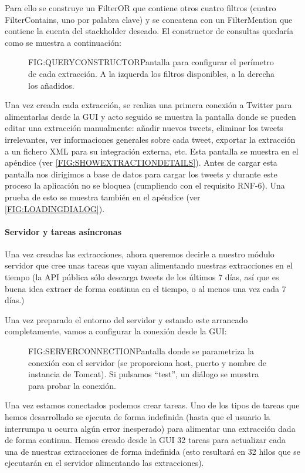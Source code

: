 Para ello se construye un FilterOR que contiene otros cuatro filtros (cuatro FilterContains, uno por palabra clave) y se concatena con un FilterMention que contiene la cuenta del stackholder deseado. El constructor de consultas quedaría como se muestra a continuación:

\begin{figure}[Constructor de consultas]{FIG:QUERYCONSTRUCTOR}{Pantalla para configurar el perímetro de cada extracción. A la izquerda los filtros disponibles, a la derecha los añadidos.}
\end{figure}

Una vez creada cada extracción, se realiza una primera conexión a Twitter para alimentarlas desde la GUI y acto seguido se muestra la pantalla donde se pueden editar una extracción manualmente: añadir nuevos tweets, eliminar los tweets irrelevantes, ver informaciones generales sobre cada tweet, exportar la extracción a un fichero XML para su integración externa, etc. Esta pantalla se muestra en el apéndice (ver \ref{FIG:SHOWEXTRACTIONDETAILS}). Antes de cargar esta pantalla nos dirigimos a base de datos para cargar los tweets y durante este proceso la aplicación no se bloquea (cumpliendo con el requisito RNF-6). Una prueba de esto se muestra también en el apéndice (ver \ref{FIG:LOADINGDIALOG}).

 \paragraph{Servidor y tareas asíncronas}
 Una vez creadas las extracciones, ahora queremos decirle a nuestro módulo servidor que cree unas tareas que vayan alimentando nuestras extracciones en el tiempo (la API pública sólo descarga tweets de los últimos 7 días, así que es buena idea extraer de forma continua en el tiempo, o al menos una vez cada 7 días.)
 
 Una vez preparado el entorno del servidor y estando este arrancado completamente, vamos a configurar la conexión desde la GUI:
 
 \begin{figure}[Conexión con TweetExtractorServer]{FIG:SERVERCONNECTION}{Pantalla donde se parametriza la conexión con el servidor (se proporciona host, puerto y nombre de instancia de Tomcat). Si pulsamos ``test'', un diálogo se muestra para probar la conexión.}
 \end{figure}

Una vez estamos conectados podemos crear tareas. Uno de los tipos de tareas que hemos desarrollado se ejecuta de forma indefinida (hasta que el usuario la interrumpa u ocurra algún error inesperado) para alimentar una extracción dada de forma continua. Hemos creado desde la GUI 32 tareas para actualizar cada una de nuestras extracciones de forma indefinida (esto resultará en 32 hilos que se ejecutarán en el servidor alimentando las extracciones).

